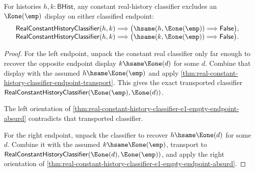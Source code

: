 \begin{theorem}
\label{thm:real-constant-history-classifier-transported-inner-empty-endpoint-absurd}
For histories $h,k:\mathsf{BHist}$, any constant real-history classifier
excludes an $\Eone(\emp)$ display on either classified endpoint:
$$
\begin{array}{l}
\mathsf{RealConstantHistoryClassifier}(h,k)
\Longrightarrow
\bigl(\hsame(h,\Eone(\emp))\Longrightarrow\mathsf{False}\bigr),\\
\mathsf{RealConstantHistoryClassifier}(h,k)
\Longrightarrow
\bigl(\hsame(k,\Eone(\emp))\Longrightarrow\mathsf{False}\bigr).
\end{array}
$$
\end{theorem}
\begin{proof}
For the left endpoint, unpack the constant real classifier only far enough to
recover the opposite endpoint display $k\hsame\Eone(d)$ for some $d$. Combine
that display with the assumed $h\hsame\Eone(\emp)$ and apply
\autoref{thm:real-constant-history-classifier-endpoint-transport}. This gives
the exact transported classifier
$\mathsf{RealConstantHistoryClassifier}(\Eone(\emp),\Eone(d))$.

The left orientation of
\autoref{thm:real-constant-history-classifier-e1-empty-endpoint-absurd}
contradicts that transported classifier.

For the right endpoint, unpack the classifier to recover
$h\hsame\Eone(d)$ for some $d$. Combine it with the assumed
$k\hsame\Eone(\emp)$, transport to
$\mathsf{RealConstantHistoryClassifier}(\Eone(d),\Eone(\emp))$, and apply the
right orientation of
\autoref{thm:real-constant-history-classifier-e1-empty-endpoint-absurd}.
\end{proof}

